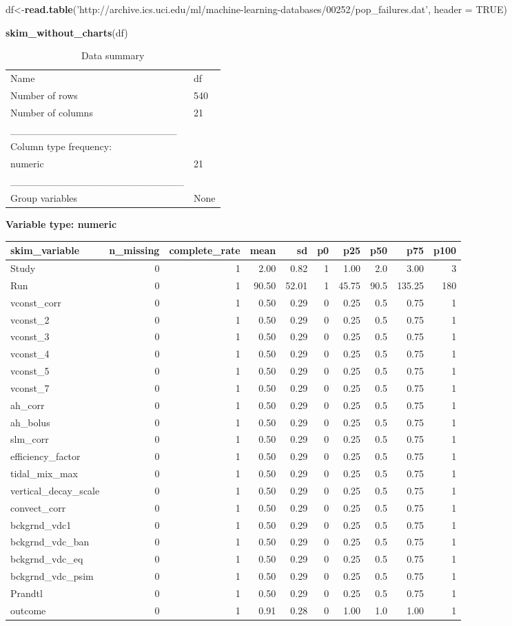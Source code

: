 \documentclass[
  11pt,
]{article}
\newenvironment{Shaded}{\begin{snugshade}}{\end{snugshade}}
\newcommand{\DataTypeTok}[1]{\textcolor[rgb]{0.13,0.29,0.53}{#1}}
\newcommand{\KeywordTok}[1]{\textcolor[rgb]{0.13,0.29,0.53}{\textbf{#1}}}
\newcommand{\NormalTok}[1]{#1}
\newcommand{\OtherTok}[1]{\textcolor[rgb]{0.56,0.35,0.01}{#1}}
\newcommand{\StringTok}[1]{\textcolor[rgb]{0.31,0.60,0.02}{#1}}
\begin{document}
\begin{Shaded}
\begin{Highlighting}[]
\NormalTok{df<-}\KeywordTok{read.table}\NormalTok{(}\StringTok{'http://archive.ics.uci.edu/ml/machine-learning-databases/00252/pop_failures.dat'}\NormalTok{, }\DataTypeTok{header =} \OtherTok{TRUE}\NormalTok{)}

\KeywordTok{skim_without_charts}\NormalTok{(df)}
\end{Highlighting}
\end{Shaded}

\begin{longtable}[]{@{}ll@{}}
\caption{Data summary}\tabularnewline
\toprule
\endhead
Name & df\tabularnewline
Number of rows & 540\tabularnewline
Number of columns & 21\tabularnewline
\_\_\_\_\_\_\_\_\_\_\_\_\_\_\_\_\_\_\_\_\_\_\_ &\tabularnewline
Column type frequency: &\tabularnewline
numeric & 21\tabularnewline
\_\_\_\_\_\_\_\_\_\_\_\_\_\_\_\_\_\_\_\_\_\_\_\_ &\tabularnewline
Group variables & None\tabularnewline
\bottomrule
\end{longtable}

\textbf{Variable type: numeric}

\begin{longtable}[]{@{}lrrrrrrrrr@{}}
\toprule
skim\_variable & n\_missing & complete\_rate & mean & sd & p0 & p25 &
p50 & p75 & p100\tabularnewline
\midrule
\endhead
Study & 0 & 1 & 2.00 & 0.82 & 1 & 1.00 & 2.0 & 3.00 & 3\tabularnewline
Run & 0 & 1 & 90.50 & 52.01 & 1 & 45.75 & 90.5 & 135.25 &
180\tabularnewline
vconst\_corr & 0 & 1 & 0.50 & 0.29 & 0 & 0.25 & 0.5 & 0.75 &
1\tabularnewline
vconst\_2 & 0 & 1 & 0.50 & 0.29 & 0 & 0.25 & 0.5 & 0.75 &
1\tabularnewline
vconst\_3 & 0 & 1 & 0.50 & 0.29 & 0 & 0.25 & 0.5 & 0.75 &
1\tabularnewline
vconst\_4 & 0 & 1 & 0.50 & 0.29 & 0 & 0.25 & 0.5 & 0.75 &
1\tabularnewline
vconst\_5 & 0 & 1 & 0.50 & 0.29 & 0 & 0.25 & 0.5 & 0.75 &
1\tabularnewline
vconst\_7 & 0 & 1 & 0.50 & 0.29 & 0 & 0.25 & 0.5 & 0.75 &
1\tabularnewline
ah\_corr & 0 & 1 & 0.50 & 0.29 & 0 & 0.25 & 0.5 & 0.75 &
1\tabularnewline
ah\_bolus & 0 & 1 & 0.50 & 0.29 & 0 & 0.25 & 0.5 & 0.75 &
1\tabularnewline
slm\_corr & 0 & 1 & 0.50 & 0.29 & 0 & 0.25 & 0.5 & 0.75 &
1\tabularnewline
efficiency\_factor & 0 & 1 & 0.50 & 0.29 & 0 & 0.25 & 0.5 & 0.75 &
1\tabularnewline
tidal\_mix\_max & 0 & 1 & 0.50 & 0.29 & 0 & 0.25 & 0.5 & 0.75 &
1\tabularnewline
vertical\_decay\_scale & 0 & 1 & 0.50 & 0.29 & 0 & 0.25 & 0.5 & 0.75 &
1\tabularnewline
convect\_corr & 0 & 1 & 0.50 & 0.29 & 0 & 0.25 & 0.5 & 0.75 &
1\tabularnewline
bckgrnd\_vdc1 & 0 & 1 & 0.50 & 0.29 & 0 & 0.25 & 0.5 & 0.75 &
1\tabularnewline
bckgrnd\_vdc\_ban & 0 & 1 & 0.50 & 0.29 & 0 & 0.25 & 0.5 & 0.75 &
1\tabularnewline
bckgrnd\_vdc\_eq & 0 & 1 & 0.50 & 0.29 & 0 & 0.25 & 0.5 & 0.75 &
1\tabularnewline
bckgrnd\_vdc\_psim & 0 & 1 & 0.50 & 0.29 & 0 & 0.25 & 0.5 & 0.75 &
1\tabularnewline
Prandtl & 0 & 1 & 0.50 & 0.29 & 0 & 0.25 & 0.5 & 0.75 & 1\tabularnewline
outcome & 0 & 1 & 0.91 & 0.28 & 0 & 1.00 & 1.0 & 1.00 & 1\tabularnewline
\bottomrule
\end{longtable}
\end{document}
